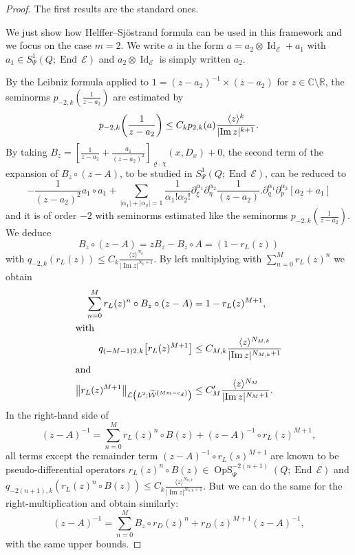 \documentclass[10pt]{amsart}
\theoremstyle{definition}\newtheorem{defi}[theo]{Definition}\newtheorem{rema}[theo]{Remark}\newtheorem{exam}[theo]{Example}\newtheorem{exem}[theo]{Example}\newtheorem{nota}[theo]{Notation}
\newcommand{\C}{\mathbb{C}}
\newcommand{\R}{\mathbb{R}}
\newcommand{\clW}{\mathcal{W}}
\newcommand{\clE}{\mathcal{E}}
\newcommand{\clL}{\mathcal{L}}
\DeclareMathOperator{\End}{End}
\DeclareMathOperator{\OpS}{OpS}
\DeclareMathOperator{\Idd}{Id}
\DeclareMathOperator{\Imm}{Im}
\let\originalleft\left
\let\originalright\right
\renewcommand{\left}{\mathopen{}\mathclose\bgroup\originalleft}
\renewcommand{\right}{\aftergroup\egroup\originalright}
\begin{document}
\begin{proof}
The first results are the standard ones.

We just show how Helffer--Sj\"ostrand formula can be used in this framework and we focus on the case $m=2$. We write $a$ in the form $a=a_{2}\otimes\Idd_{\clE}+a_{1}$ with $a_{1}\in S^{1}_{\Psi}(Q;\End\,\clE)$ and $a_{2}\otimes \Idd_{\clE}$ is simply written $a_{2}$.

By the Leibniz formula applied to $1=(z-a_{2})^{-1}\times(z-a_{2})$ for $z\in \C\setminus \R$, the seminorms $p_{-2,k}(\frac{1}{z-a_{2}})$ are estimated by
\[
p_{-2,k}\left(\frac{1}{z-a_{2}}\right)\leq C_{k}p_{2,k}(a) \frac{\langle z\rangle^{k}}{\lvert\Imm z|^{k+1}}.
\]
By taking $B_{z}=[\frac{1}{z-a_{2}}+\frac{a_{1}}{(z-a_{2})^{2}}]_{\varrho,\chi}(x,D_{x})+0$, the second term of the expansion of $B_{z}\circ (z-A)$, to be studied in $S^{1}_{\Psi}(Q;\End\,\clE)$, can be reduced to
\[
-\frac{1}{(z-a_{2})^{2}}a_{1}\circ a_{1}+
\sum_{|\alpha_{1}|+|\alpha_{2}|= 1}\frac{1}{\alpha_{1}!\alpha_{2}!}\partial_{\xi}^{\alpha_{1}}\partial_{\eta}^{\alpha_{2}}\frac{1}{(z-a_{2})}.\partial_{q}^{\alpha_{1}}\partial_{p}^{\alpha_{2}}[a_{2}+a_{1}]
\]
and it is of order $-2$ with seminorms estimated like the seminorms $p_{-2,k}(\frac{1}{z-a_{2}})$. We deduce
\[
B_{z}\circ (z-A)=zB_{z} -B_{z}\circ A= (1-r_{L}(z))
\]
with $q_{-2,k}(r_{L}(z))\leq C_{k}\frac{\langle z\rangle^{N_{k}}}{\lvert\Imm z|^{N_{k}+1}}$. By left multiplying with $\sum_{n=0}^{M}r_{L}(z)^{n}$ we obtain
\begin{align*}
\sum_{n=0}^{M}r_{L}(z)^{n}\circ B_{z}\circ (z-A)&=1-r_{L}(z)^{M+1},
\\
\intertext{with}
q_{(-M-1)2,k}\left[r_{L}(z)^{M+1}\right]&\leq C_{M,k}\frac{\langle z\rangle^{N_{M,k}}}{\lvert\Imm z|^{N_{M,k}+1}}\\
\intertext{and}
\left\|r_{L}(z)^{M+1}\right\|_{\clL\left(L^{2};\widetilde{\clW}^{\left(Mm-c_{d}\right)}\right)}&\leq C'_{M}\frac{\langle z\rangle^{N_{M}}}{\lvert\Imm z|^{N_{M}+1}}.
\end{align*}
In the right-hand side of
\[
(z-A)^{-1}=\sum_{n=0}^{M}r_{L}(z)^{n}\circ B(z)+(z-A)^{-1}\circ r_{L}(z)^{M+1},
\]
all terms except the remainder term $(z-A)^{-1}\circ r_{L}(s)^{M+1}$ are known to be pseudo-differential operators $r_{L}(z)^{n}\circ B(z)\in \OpS^{-2(n+1)}_{\Psi}(Q;\End\,\clE)$ and $q_{-2(n+1),k}(r_{L}(z)^{n}\circ B(z))\leq C_{k}\frac{\langle z\rangle^{N_{n,k}}}{\lvert\Imm z|^{N_{n,k}+1}}$. But we can do the same for the right-multiplication and obtain similarly:
\[
(z-A)^{-1}=\sum_{n=0}^{M}B_{z}\circ r_{D}(z)^{n}+r_{D}(z)^{M+1}(z-A)^{-1},
\]
with the same upper bounds.


\end{proof}
\end{document}
